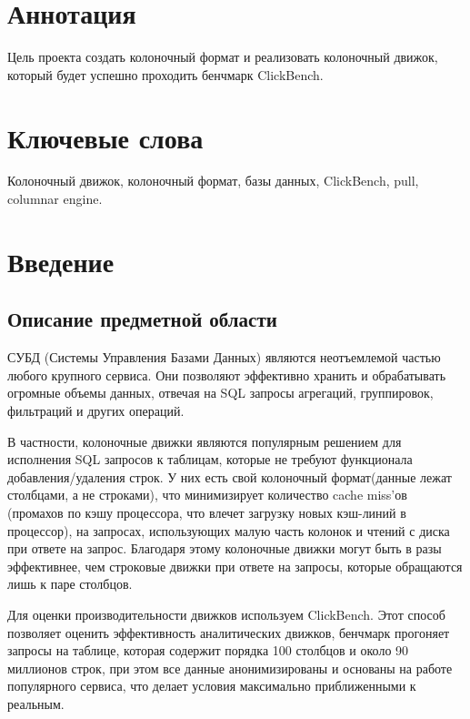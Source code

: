 \documentclass[a4paper,12pt]{extarticle}
\begin{document}
\newpage
\setcounter{page}{2}

{
	\hypersetup{linkcolor=black}
	\tableofcontents
}

\newpage

\section*{Аннотация}
Цель проекта создать колоночный формат и реализовать колоночный движок, который
будет успешно проходить бенчмарк ClickBench.


\section*{Ключевые слова}
Колоночный движок, колоночный формат, базы данных, ClickBench, pull, columnar engine.
\pagebreak

\section{Введение}
\subsection{Описание предметной области}
СУБД (Системы Управления Базами Данных) являются неотъемлемой частью любого крупного
сервиса. Они позволяют эффективно хранить и обрабатывать огромные объемы данных,
отвечая на SQL запросы агрегаций, группировок, фильтраций и других операций.

В частности, колоночные движки являются популярным решением для исполнения SQL
запросов к таблицам, которые не требуют функционала добавления/удаления строк.
У них есть свой колоночный формат(данные лежат столбцами, а не строками), что
минимизирует количество cache miss’ов (промахов по кэшу 
процессора, что влечет загрузку новых кэш-линий в процессор),
 на 
запросах, использующих малую часть колонок и чтений
с диска при ответе на запрос. Благодаря этому колоночные движки могут быть в разы
эффективнее, чем строковые движки при ответе на запросы, которые обращаются лишь к
паре столбцов.



Для оценки производительности движков используем ClickBench. Этот способ позволяет
оценить эффективность аналитических движков, бенчмарк прогоняет запросы на таблице, которая
содержит порядка 100 столбцов и около 90 миллионов строк, при этом все данные
анонимизированы и основаны на работе популярного сервиса, что делает условия
максимально приближенными к реальным.
\end{document}
